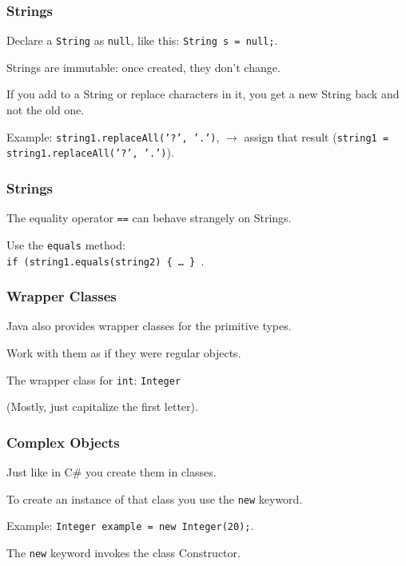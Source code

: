 \begin{frame}
\frametitle{Strings}
\begin{changemargin}{1cm}

Declare a \texttt{String} as \texttt{null}, like this: \texttt{String s = null;}.

Strings are immutable: once created, they don't change. 

If you add to a String or replace characters in it, you get a new String back and not the old one. 

Example: \texttt{string1.replaceAll('?', '.')}, $\rightarrow$ assign that result  (\texttt{string1 = string1.replaceAll('?', '.')}). 

\end{changemargin}
\end{frame}


\begin{frame}
\frametitle{Strings}
\begin{changemargin}{1cm}

The equality operator \texttt{==} can behave strangely on Strings. 

Use the \texttt{equals} method:\\
\quad \texttt{if (string1.equals(string2) \{ \ldots~\} }.

\end{changemargin}
\end{frame}


\begin{frame}
\frametitle{Wrapper Classes}
\begin{changemargin}{1cm}
Java also provides wrapper classes for the primitive types.

Work with them as if they were regular objects. 

The wrapper class for \texttt{int}: \texttt{Integer} 

(Mostly, just capitalize the first letter). 
\end{changemargin}
\end{frame}

\begin{frame}
\frametitle{Complex Objects}
\begin{changemargin}{1cm}
Just like in C\# you create them in classes. 

To create an instance of that class you use the \texttt{new} keyword. 

Example: \texttt{Integer example = new Integer(20);}. 

The \texttt{new} keyword invokes the class Constructor.
\end{changemargin}
\end{frame}

